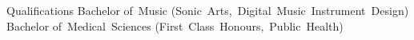 \begin{rubric}{Qualifications}
      \entry*[2016]
         \prefix{}
         Bachelor of~Music \mbox{(Sonic~Arts, Digital~Music~Instrument~Design)}
      \entry*[2007]
         \prefix{}
         Bachelor of~Medical~Sciences \mbox{(First~Class~Honours, Public~Health)}
\end{rubric}